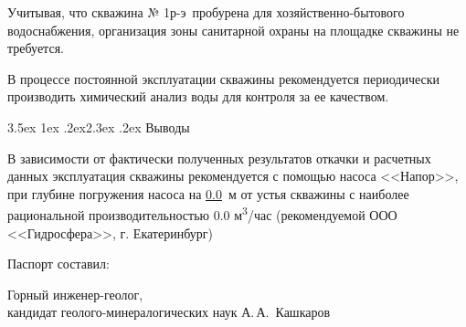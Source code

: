 \documentclass[a4paper,12pt]{article} %
\makeatletter
\renewcommand\section{\@startsection {section}{1}{\parindent}%
	{3.5ex \@plus 1ex \@minus .2ex}{2.3ex \@plus.2ex}%
	{\normalfont\hyphenpenalty=10000\Large\bfseries}}
\newcommand{\txtExecutor}{ООО <<Гидросфера>>}	%
\newcommand{\txtNumber}{№ 1р-э}  				%
\newcommand{\txtPump}{<<Напор>>}  				%
\newcommand{\txtDebit}{0.0}					%
\newcommand{\txtPumpDepth}{0.0}					%
\makeatother
\begin{document}
Учитывая, что скважина \txtNumber \, пробурена для хозяйственно-бытового водоснабжения, организация зоны санитарной охраны на площадке скважины не требуется.

В процессе постоянной эксплуатации скважины рекомендуется периодически производить химический анализ воды для контроля за ее качеством.

\section{Выводы}

В зависимости от фактически полученных результатов откачки и расчетных данных эксплуатация скважины рекомендуется с помощью насоса  \txtPump, при глубине погружения насоса  на \underline{\num{\txtPumpDepth}} \,м от устья скважины с наиболее рациональной производительностью 	{\num{\txtDebit}} м\textsuperscript{3}/час (рекомендуемой \txtExecutor, г. Екатеринбург)

\bigskip

Паспорт составил:

\bigskip

\begin{minipage}{1.0\textwidth}
	Горный инженер-геолог,\\
	кандидат геолого-минералогических наук 
	А.\,А.~Кашкаров
\end{minipage}
\end{document}
